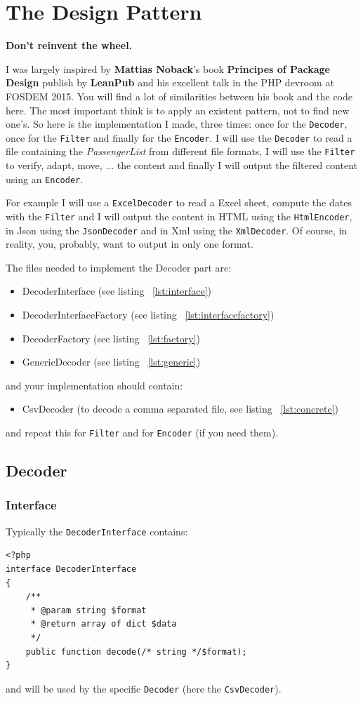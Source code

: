 \documentclass[a4paper, 11pt]{article}
\newcommand{\head}[1]{\textnormal{\textbf{#1}}}
\begin{document}
\section{The Design Pattern}
\head{Don't reinvent the wheel.}

I was largely inspired by \textbf{Mattias Noback}'s book \textbf{Principes of Package Design} publish by \textbf{LeanPub} and his excellent talk in the PHP devroom at FOSDEM 2015. You will find a lot of similarities between his book and the code here. The most important think is to apply an existent pattern, not to find new one's. So here is the implementation I made, three times: once for the \texttt{Decoder}, once for the \texttt{Filter} and finally for the \texttt{Encoder}. I will use the \texttt{Decoder} to read a file containing the \textit{PassengerList} from different file formats, I will use the \texttt{Filter} to verify, adapt, move, ... the content and finally I will output the filtered content using an \texttt{Encoder}.

For example I will use a \texttt{ExcelDecoder} to read a Excel sheet, compute the dates with the \texttt{Filter} and I will output the content in HTML using the \texttt{HtmlEncoder}, in Json using the \texttt{JsonDecoder} and in Xml using the \texttt{XmlDecoder}. Of course, in reality, you, probably, want to output in only one format.

The files needed to implement the Decoder part are:
\begin{itemize}
\item DecoderInterface (see listing ~\ref{lst:interface})
\item DecoderInterfaceFactory (see listing ~\ref{lst:interfacefactory})
\item DecoderFactory (see listing ~\ref{lst:factory})
\item GenericDecoder (see listing ~\ref{lst:generic})
\end{itemize}
and your implementation should contain:
\begin{itemize}
\item CsvDecoder (to decode a comma separated file, see listing ~\ref{lst:concrete})
\end{itemize}
and repeat this for \texttt{Filter} and for \texttt{Encoder} (if you need them).
\subsection{Decoder}
\subsubsection{Interface}
Typically the \texttt{DecoderInterface} contains:
 \label{lst:interface}
\begin{lstlisting}
<?php
interface DecoderInterface
{
	/**
	 * @param string $format
	 * @return array of dict $data
	 */
	public function decode(/* string */$format);
}
\end{lstlisting}
and will be used by the specific \texttt{Decoder} (here the \texttt{CsvDecoder}).
 
\end{document}
